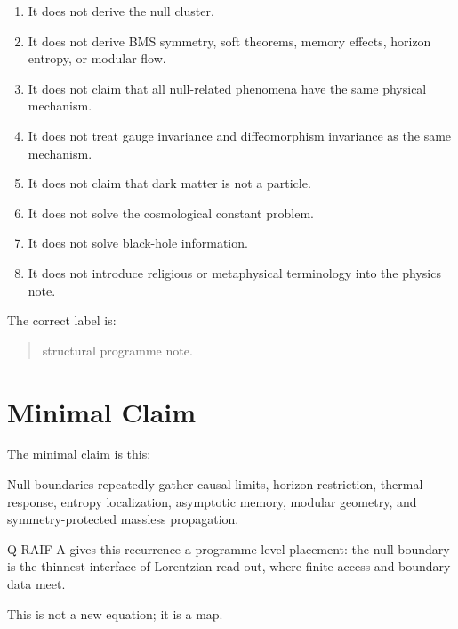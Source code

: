 \documentclass[12pt,a4paper]{article}
\theoremstyle{definition}
\theoremstyle{remark}
\newcommand{\tightlist}{%
  \setlength{\itemsep}{0pt}\setlength{\parskip}{0pt}}
\begin{document}
\begin{enumerate}[leftmargin=*]
\tightlist
\item
  It does not derive the null cluster.
\item
  It does not derive BMS symmetry, soft theorems, memory effects,
  horizon entropy, or modular flow.
\item
  It does not claim that all null-related phenomena have the same
  physical mechanism.
\item
  It does not treat gauge invariance and diffeomorphism invariance as
  the same mechanism.
\item
  It does not claim that dark matter is not a particle.
\item
  It does not solve the cosmological constant problem.
\item
  It does not solve black-hole information.
\item
  It does not introduce religious or metaphysical terminology into the
  physics note.
\end{enumerate}

The correct label is:

\begin{quote}
structural programme note.
\end{quote}

\section{Minimal Claim}\label{minimal-claim}

The minimal claim is this:

Null boundaries repeatedly gather causal limits, horizon restriction,
thermal response, entropy localization, asymptotic memory, modular
geometry, and symmetry-protected massless propagation.

Q-RAIF A gives this recurrence a programme-level placement: the null
boundary is the thinnest interface of Lorentzian read-out, where finite
access and boundary data meet.

This is not a new equation; it is a map.
\end{document}
